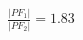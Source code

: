 \documentclass[preview]{standalone}
\begin{document}
\begin{align*}
\frac{|PF_1|}{|PF_2|} = 1.83
\end{align*}
\end{document}
